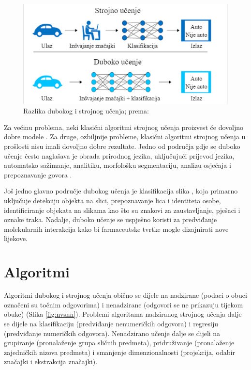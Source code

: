 \documentclass[]{foi} %
\begin{document}
\vspace{10mm}
\begin{figure}[!ht]
    \centering
    \includegraphics[width=1\textwidth]{slike/mlvsdl.png}
    \caption{Razlika dubokog i strojnog učenja; prema: \cite{builtin1}}
    \label{fig:mlvsdl}
\end{figure}
\vspace{10mm}

Za većinu problema, neki klasični algoritmi strojnog učenja proizvest će dovoljno dobre modele \cite{tds2}. Za druge, ozbiljnije probleme, klasični algoritmi strojnog učenja u prošlosti nisu imali dovoljno dobre rezultate. Jedno od područja gdje se duboko učenje često naglašava je obrada prirodnog jezika, uključujući prijevod jezika, automatsko sažimanje, analitiku, morfološku segmentaciju, analizu osjećaja i prepoznavanje govora \cite{tds1}.

Još jedno glavno područje dubokog učenja je klasifikacija slika \cite{tds1}, koja primarno uključuje detekciju objekta na slici, prepoznavanje lica i identiteta osobe, identificiranje objekata na slikama kao što su znakovi za zaustavljanje, pješaci i oznake traka. Nadalje, duboko učenje se uspješno koristi za predviđanje molekularnih interakcija kako bi farmaceutske tvrtke mogle dizajnirati nove lijekove.

\newpage
\section{Algoritmi}

Algoritmi dubokog i strojnog učenja \cite[str. 98-105]{deep} obično se dijele na nadzirane (podaci o obuci označeni su točnim odgovorima) i nenadzirane (odgovori se ne prikazuju tijekom obuke) (Slika \ref{fig:nvsnn}). Problemi algoritama nadziranog strojnog učenja dalje se dijele na klasifikaciju (predviđanje nenumeričkih odgovora) i regresiju (predviđanje numeričkih odgovora). Nenadzirano učenje dalje se dijeli na grupiranje (pronalaženje grupa sličnih predmeta), pridruživanje (pronalaženje zajedničkih nizova predmeta) i smanjenje dimenzionalnosti (projekcija, odabir značajki i ekstrakcija značajki).
\end{document}
